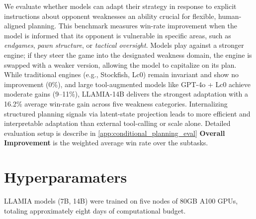 \begin{table}[h]
{We evaluate whether models can adapt their strategy in response to explicit instructions about opponent weaknesses an ability crucial for flexible, human-aligned planning. This benchmark measures win-rate improvement when the model is informed that its opponent is vulnerable in specific areas, such as \emph{endgames}, \emph{pawn structure}, or \emph{tactical oversight}. Models play against a stronger engine; if they steer the game into the designated weakness domain, the engine is swapped with a weaker version, allowing the model to capitalize on its plan. While traditional engines (e.g., Stockfish, Lc0) remain invariant and show no improvement (0\%), and large tool-augmented models like GPT-4o + Lc0 achieve moderate gains (9–11\%), LLAMIA-14B delivers the strongest adaptation with a 16.2\% average win-rate gain across five weakness categories. Internalizing structured planning signals via latent-state projection leads to more efficient and interpretable adaptation than external tool-calling or scale alone. Detailed evaluation setup is describe in \cref{app:conditional_planning_eval} \textbf{Overall Improvement} is the weighted average win rate over the subtasks. 
}

    \label{tab:instruct_conditioned_planning}
\end{table}










\section{Hyperparamaters}
\label{sec:hyperparams}
LLAMIA models (7B, 14B) were trained on five nodes of 80GB A100 GPUs, totaling
approximately eight days of computational budget.
